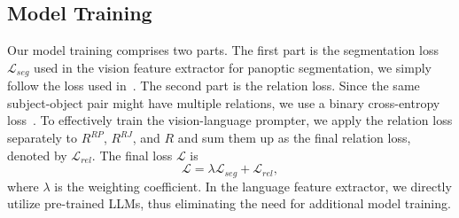 \subsection{Model Training}
\label{vlprompt:sec:model_training}
Our model training comprises two parts.
The first part is the segmentation loss $\mathcal{L}_{seg}$ used in the vision feature extractor for panoptic segmentation, we simply follow the loss used in~\citet{cheng2022masked}.
The second part is the relation loss. Since the same subject-object pair might have multiple relations, we use a binary cross-entropy loss~\citep{su2022zlpr}.
To effectively train the vision-language prompter, we apply the relation loss separately to $R^{RP}$, $R^{RJ}$, and $R$ and sum them up as the final relation loss, denoted by  $\mathcal{L}_{rel}$.
The final loss $\mathcal{L}$ is
\begin{equation}
    \mathcal{L} = \lambda \mathcal{L}_{seg} + \mathcal{L}_{rel},
\end{equation}
where $\lambda$ is the weighting coefficient.
In the language feature extractor, we directly utilize pre-trained LLMs, thus eliminating the need for additional model training.
